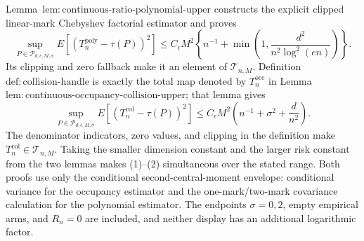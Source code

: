 Lemma~\(\mathrm{lem:continuous\text{-}ratio\text{-}polynomial\text{-}upper}\) constructs the explicit clipped linear-mark Chebyshev factorial estimator and proves
\[
 \sup_{P\in\mathcal P_{d,\epsilon,M,\sigma}}
 E[(T_n^{\mathrm{poly}}-\tau(P))^2]
 \le C_\epsilon M^2\left\{n^{-1}+\min\left(1,\frac{d^2}{n^2\log^2(en)}\right)\right\}.
\tag{1}
\]
Its clipping and zero fallback make it an element of \(\mathcal T_{n,M}\).  Definition~\(\mathrm{def:collision\text{-}handle}\) is exactly the total map denoted by \(T_n^{\mathrm{occ}}\) in Lemma~\(\mathrm{lem:continuous\text{-}occupancy\text{-}collision\text{-}upper}\); that lemma gives
\[
 \sup_{P\in\mathcal P_{d,\epsilon,M,\sigma}}
 E[(T_n^{\mathrm{col}}-\tau(P))^2]
 \le C_\epsilon M^2\left(n^{-1}+\sigma^2+\frac d{n^2}\right).
\tag{2}
\]
The denominator indicators, zero values, and clipping in the definition make \(T_n^{\mathrm{col}}\in\mathcal T_{n,M}\).  Taking the smaller dimension constant and the larger risk constant from the two lemmas makes (1)--(2) simultaneous over the stated range.  Both proofs use only the conditional second-central-moment envelope: conditional variance for the occupancy estimator and the one-mark/two-mark covariance calculation for the polynomial estimator.  The endpoints \(\sigma=0,2\), empty empirical arms, and \(R_n=0\) are included, and neither display has an additional logarithmic factor.